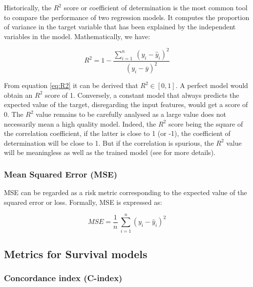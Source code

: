 \documentclass[
]{book}
\begin{document}
Historically, the \(R^2\) score or coefficient of determination is the most common tool to compare the performance of two regression models. It computes the proportion of variance in the target variable that has been explained by the independent variables in the model. Mathematically, we have:

\begin{equation}
  R^2 = 1 - \frac{\sum_{i=1}^n \ (y_i - \hat{y}_i)^2}{(y_i - \overline{y})^2}
  \label{eq:R2}
\end{equation}

From equation \eqref{eq:R2} it can be derived that \(R^2 \in [0, 1]\). A perfect model would obtain an \(R^2\) score of 1. Conversely, a constant model that always predicts the expected value of the target, disregarding the input features, would get a score of 0. The \(R^2\) value remains to be carefully analysed as a large value does not necessarily mean a high quality model. Indeed, the \(R^2\) score being the square of the correlation coefficient, if the latter is close to 1 (or -1), the coefficient of determination will be close to 1. But if the correlation is spurious, the \(R^2\) value will be meaningless as well as the trained model (see \citet{BOUSQUET_ECONOMETRICS} for more details).

\hypertarget{mean-squared-error-mse}{%
\subsubsection*{Mean Squared Error (MSE)}\label{mean-squared-error-mse}}

MSE can be regarded as a risk metric corresponding to the expected value of the squared error or loss. Formally, MSE is expressed as:

\begin{equation}
  MSE = \frac{1}{n} \ \sum_{i=1}^{n} (y_i - \hat{y}_i)^2
  \label{eq:MSE}
\end{equation}

\hypertarget{metrics-for-survival-models}{%
\subsection{Metrics for Survival models}\label{metrics-for-survival-models}}

\hypertarget{concordance-index-c-index}{%
\subsubsection*{Concordance index (C-index)}\label{concordance-index-c-index}}
\end{document}
